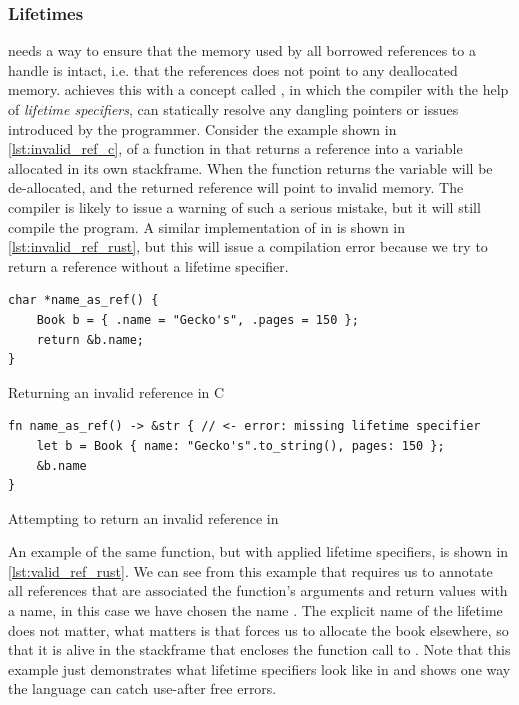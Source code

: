 \subsubsection{Lifetimes}
\label{ssec:lifetimes}

{\rust} needs a way to ensure that the memory used by all borrowed references to a handle is intact, i.e. that the references does not point to any deallocated memory.
{\rust} achieves this with a concept called , in which the compiler with the help of \emph{lifetime specifiers}, can statically resolve any dangling pointers or  issues introduced by the programmer.
Consider the example shown in \autoref{lst:invalid_ref_c}, of a function in {\C} that returns a reference into a variable allocated in its own stackframe.
When the function returns the variable will be de-allocated, and the returned reference will point to invalid memory.
The {\C} compiler is likely to issue a warning of such a serious mistake, but it will still compile the program.
A similar implementation of  in {\rust} is shown in \autoref{lst:invalid_ref_rust}, but this will issue a compilation error because we try to return a reference without a lifetime specifier.

\begin{listing}[tb]
\begin{verbatim}
char *name_as_ref() {
    Book b = { .name = "Gecko's", .pages = 150 };
    return &b.name;
}
\end{verbatim}
\caption{Returning an invalid reference in C}
\label{lst:invalid_ref_c}
\end{listing}

\begin{listing}[tb]
\begin{verbatim}
fn name_as_ref() -> &str { // <- error: missing lifetime specifier
    let b = Book { name: "Gecko's".to_string(), pages: 150 };
    &b.name
}
\end{verbatim}
\caption{Attempting to return an invalid reference in {\rust}}
\label{lst:invalid_ref_rust}
\end{listing}

An example of the same function, but with applied lifetime specifiers, is shown in \autoref{lst:valid_ref_rust}.
We can see from this example that {\rust} requires us to annotate all references that are associated the function's arguments and return values with a name, in this case we have chosen the name .
The explicit name of the lifetime does not matter, what matters is that {\rust} forces us to allocate the book elsewhere, so that it is alive in the stackframe that encloses the function call to .
Note that this example just demonstrates what lifetime specifiers look like in {\rust} and shows one way the language can catch use-after free errors.

